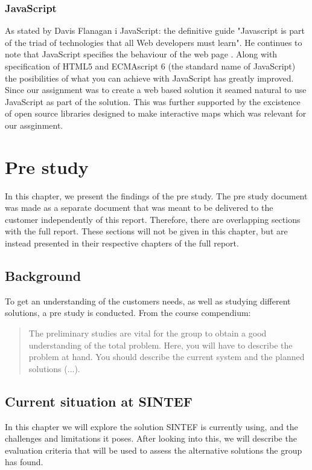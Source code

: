 \documentclass[11pt,a4paper,titlepage,oneside]{report}
\begin{document}
  \subsection{JavaScript}
  As stated by Davis Flanagan i JavaScript: the definitive guide "Javascript is part of the triad of technologies that all Web developers must learn". He continues to note that JavaScript specifies the behaviour of the web page \cite{fd11}. Along with specification of HTML5 and ECMAscript 6 (the standard name of JavaScript) the posibilities of what you can achieve with JavaScript has greatly improved. Since our assignment was to create a web based solution it seamed natural to use JavaScript as part of the solution. This was further supported by the excistence of open source libraries designed to make interactive maps which was relevant for our assginment.

\chapter{Pre study}
In this chapter, we present the findings of the pre study. The pre study document was made as a separate document that was meant to be delivered to the customer independently of this report. Therefore, there are overlapping sections with the full report. These sections will not be given in this chapter, but are instead presented in their respective chapters of the full report. 

\section{Background}
To get an understanding of the customers needs, as well as studying different solutions, a pre study is conducted. From the course compendium:
\begin{quote}
The preliminary studies are vital for the group to obtain a good understanding of the total problem.
Here, you will have to describe the problem at hand. You should describe the current system and the
planned solutions (...).
\cite{TDT4290:Intro}
\end{quote}

\section{Current situation at SINTEF}
In this chapter we will explore the solution SINTEF is currently using, and the challenges and limitations it poses. After looking into this, we will describe the evaluation criteria that will be used to assess the alternative solutions the group has found. 
\end{document}
